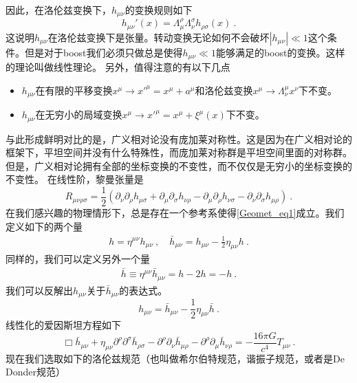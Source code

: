 因此，在洛伦兹变换下，$h_{\mu\nu}$的变换规则如下
\begin{equation}
h_{\mu\nu}'(x) = \Lambda^\rho_\mu\Lambda^\sigma_\nu h_{\rho\sigma} (x) ~. 
\end{equation}
这说明$h_{\mu\nu}$在洛伦兹变换下是张量。转动变换无论如何不会破坏$|h_{\mu\nu}|\ll 1$这个条件。但是对于boost我们必须只做总是使得$h_{\mu\nu}\ll 1$能够满足的boost的变换。这样的理论叫做线性理论。
另外，值得注意的有以下几点
\begin{itemize}
\item $h_{\mu\nu}$在有限的平移变换$x^\mu\rightarrow x'^\mu = x^\mu + a^\mu$和洛伦兹变换$x^\mu\rightarrow \Lambda^\mu_\nu x^\nu$下不变。
\item $h_{\mu\nu}$在无穷小的局域变换$x^\mu \rightarrow x'^\mu = x^\mu + \xi^\mu (x)$下不变。
\end{itemize}
与此形成鲜明对比的是，广义相对论没有庞加莱对称性。这是因为在广义相对论的框架下，平坦空间并没有什么特殊性，而庞加莱对称群是平坦空间里面的对称群。但是，广义相对论拥有全部的坐标变换的不变性，而不仅仅是无穷小的坐标变换的不变性。
在线性阶，黎曼张量是
\begin{equation}
R_{\mu\nu\rho\sigma} = \frac{1}{2}  (\partial_\nu\partial_\rho h_{\mu\sigma} + \partial_\mu\partial_\sigma h_{\nu\rho} - \partial_\mu\partial_\rho h_{\nu\sigma} - \partial_\nu\partial_\sigma h_{\mu\rho}  ) ~.
\end{equation} 
在我们感兴趣的物理情形下，总是存在一个参考系使得\autoref{Geomet_eq1}成立。我们定义如下的两个量 
\begin{align}
h = \eta^{\mu\nu} h_{\mu\nu} ~, \quad \bar h_{\mu\nu} = h_{\mu\nu} - \frac{1}{2} \eta_{\mu\nu} h~.
\end{align}
同样的，我们可以定义另外一个量
\begin{align}
\bar h \equiv \eta^{\mu\nu} \bar h_{\mu\nu} = h - 2 h = -h~.
\end{align}
我们可以反解出$h_{\mu\nu}$关于$\bar h_{\mu\nu}$的表达式。
\begin{equation}
h_{\mu\nu} = \bar h_{\mu\nu} - \frac{1}{2} \eta_{\mu\nu} \bar h ~. 
\end{equation}
线性化的爱因斯坦方程如下
\begin{equation}
\Box \bar h_{\mu\nu} + \eta_{\mu\nu} \partial^\rho \partial^\sigma \bar h_{\rho\sigma} - \partial^\rho \partial_\nu \bar h_{\mu\rho} - \partial^\rho\partial_\mu \bar h_{\nu\rho} = - \frac{16\pi G}{c^4} T_{\mu\nu} ~. 
\end{equation}
现在我们选取如下的洛伦兹规范（也叫做希尔伯特规范，谐振子规范，或者是De Donder规范）
